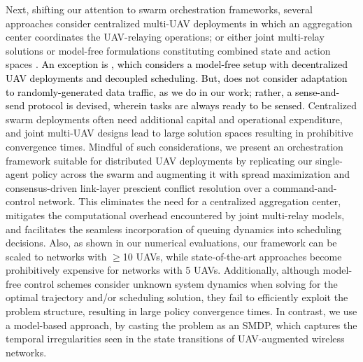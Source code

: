 \documentclass[12pt, draftcls, onecolumn]{IEEEtran}
\theoremstyle{plain}
\theoremstyle{definition}
\theoremstyle{remark}
\newcommand\hlt[1]{\textcolor{black}{#1}}
\begin{document}
Next, shifting our attention to swarm orchestration frameworks, several approaches consider centralized multi-UAV deployments \cite{JointTrajectoryDesign, MultiDroneDeployment, CSCA-ADMM} in which an aggregation center coordinates the UAV-relaying operations; or either joint multi-relay solutions \cite{CSCA-ADMM, GameTheory, UAVDynamicCoverage} or model-free formulations constituting combined state and action spaces \cite{DDQN, MEC-DDPG, DQNPositioning, MLDeployment}. \hlt{An exception is \cite{RLSenseSend}, which considers a model-free setup with decentralized UAV deployments and decoupled scheduling. But, \cite{RLSenseSend} does not consider adaptation to randomly-generated data traffic, as we do in our work; rather, a sense-and-send protocol is devised, wherein tasks are always ready to be sensed.} Centralized swarm deployments often need additional capital and operational expenditure, and joint multi-UAV designs lead to large solution spaces resulting in prohibitive convergence times. Mindful of such considerations, we present an orchestration framework suitable for distributed UAV deployments by replicating our single-agent policy across the swarm and augmenting it with spread maximization and consensus-driven link-layer prescient conflict resolution over a command-and-control network. This eliminates the need for a centralized aggregation center, mitigates the computational overhead encountered by joint multi-relay models, and facilitates the seamless incorporation of queuing dynamics into scheduling decisions. Also, as shown in our numerical evaluations, our framework can be scaled to networks with $\geq$10 UAVs, while state-of-the-art approaches \cite{SCA, CSCA-ADMM, DDQN} become prohibitively expensive for networks with 5 UAVs. Additionally, although model-free control schemes \cite{DDQN, MEC-DDPG, RLSenseSend, DQNPositioning, MLDeployment, UAV-DRL} consider unknown system dynamics when solving for the optimal trajectory and/or scheduling solution, they fail to efficiently exploit the problem structure, resulting in large policy convergence times. In contrast, we use a model-based approach, by casting the problem as an SMDP, which captures the temporal irregularities seen in the state transitions of UAV-augmented wireless networks.
\end{document}
